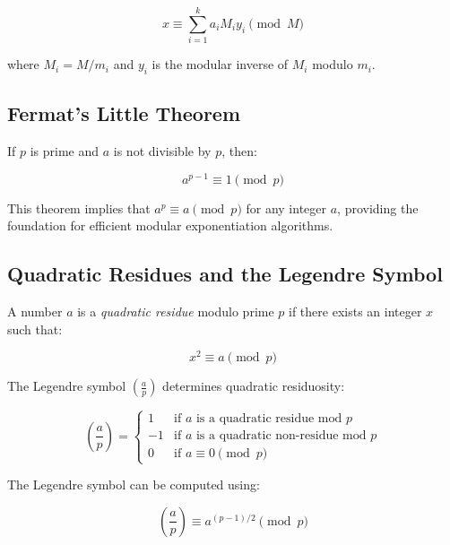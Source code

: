 \documentclass[11pt,a4paper]{article}
\begin{document}
\begin{equation}
x \equiv \sum_{i=1}^{k} a_i M_i y_i \pmod{M}
\end{equation}

where $M_i = M/m_i$ and $y_i$ is the modular inverse of $M_i$ modulo $m_i$.

\subsection{Fermat's Little Theorem}

\begin{theorem}
If $p$ is prime and $a$ is not divisible by $p$, then:

\begin{equation}
a^{p-1} \equiv 1 \pmod{p}
\end{equation}
\end{theorem}

This theorem implies that $a^p \equiv a \pmod{p}$ for any integer $a$, providing the foundation for efficient modular exponentiation algorithms.

\subsection{Quadratic Residues and the Legendre Symbol}

A number $a$ is a \textit{quadratic residue} modulo prime $p$ if there exists an integer $x$ such that:

\begin{equation}
x^2 \equiv a \pmod{p}
\end{equation}

The Legendre symbol $\left(\frac{a}{p}\right)$ determines quadratic residuosity:

\begin{equation}
\left(\frac{a}{p}\right) = \begin{cases}
1 & \text{if } a \text{ is a quadratic residue mod } p \\
-1 & \text{if } a \text{ is a quadratic non-residue mod } p \\
0 & \text{if } a \equiv 0 \pmod{p}
\end{cases}
\end{equation}

The Legendre symbol can be computed using:

\begin{equation}
\left(\frac{a}{p}\right) \equiv a^{(p-1)/2} \pmod{p}
\end{equation}
\end{document}
